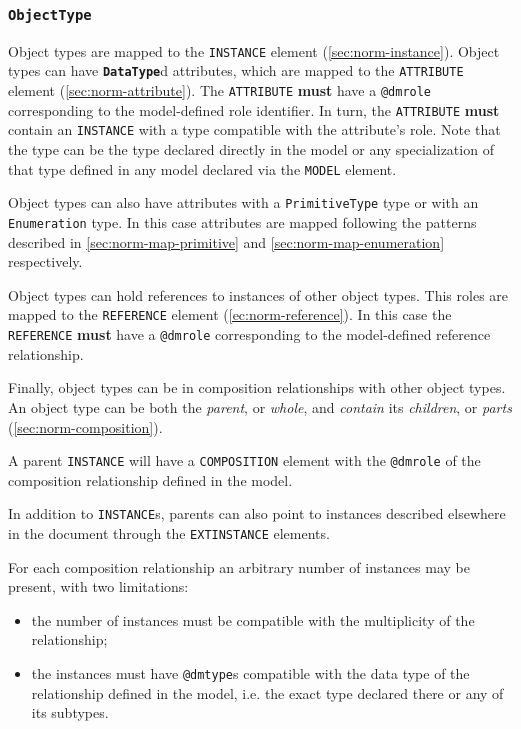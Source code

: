 \documentclass[11pt,a4paper]{ivoa}
\begin{document}
\subsubsection{\textbf{\texttt{ObjectType}}}\label{sec:norm-object}

Object types are mapped to the \texttt{INSTANCE} element
(\ref{sec:norm-instance}). Object types can have
\textbf{\texttt{DataType}}d attributes, which are mapped to the
\texttt{ATTRIBUTE} element (\ref{sec:norm-attribute}). The
\texttt{ATTRIBUTE} \textbf{must} have a \texttt{@dmrole} corresponding
to the model-defined role identifier. In turn, the \texttt{ATTRIBUTE}
\textbf{must} contain an \texttt{INSTANCE} with a type compatible with
the attribute's role. Note that the type can be the type declared
directly in the model or any specialization of that type defined in any
model declared via the \texttt{MODEL} element.

Object types can also have attributes with a \texttt{PrimitiveType} type
or with an \texttt{Enumeration} type. In this case attributes are mapped
following the patterns described in \ref{sec:norm-map-primitive} and
\ref{sec:norm-map-enumeration} respectively.

Object types can hold references to instances of other object types.
This roles are mapped to the \texttt{REFERENCE} element
(\ref{ec:norm-reference}). In this case the \texttt{REFERENCE}
\textbf{must} have a \texttt{@dmrole} corresponding to the model-defined
reference relationship.

Finally, object types can be in composition relationships with other
object types. An object type can be both the \emph{parent}, or
\emph{whole}, and \emph{contain} its \emph{children}, or \emph{parts}
(\ref{sec:norm-composition}).

A parent \texttt{INSTANCE} will have a \texttt{COMPOSITION} element with
the \texttt{@dmrole} of the composition relationship defined in the
model.

In addition to \texttt{INSTANCE}s, parents can also point to instances
described elsewhere in the document through the \texttt{EXTINSTANCE}
elements.

For each composition relationship an arbitrary number of instances may
be present, with two limitations:

\begin{itemize}
\itemsep1pt\parskip0pt
\item
  the number of instances must be compatible with the multiplicity of
  the relationship;
\item
  the instances must have \texttt{@dmtype}s compatible with the data
  type of the relationship defined in the model, i.e. the exact type
  declared there or any of its subtypes.
\end{itemize}
\end{document}
